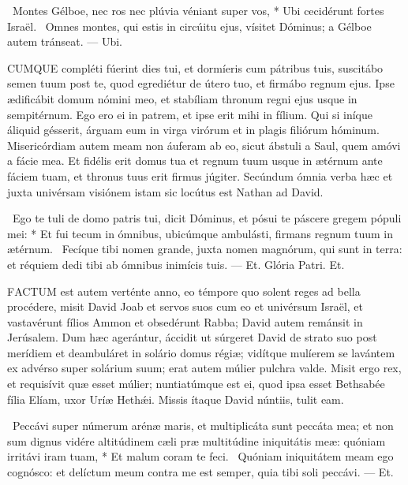 \R\ Montes Gélboe, nec ros nec plúvia véniant super vos, * Ubi cecidérunt fortes Israël. \V\ Omnes montes, qui estis in circúitu ejus, vísitet Dóminus; a Gélboe autem tránseat. --- Ubi.



\lettrine[lines=2]{C}{UMQUE} compléti fúerint dies tui, et dormíeris cum pátribus tuis, suscitábo semen tuum post te, quod egrediétur de útero tuo, et firmábo regnum ejus. Ipse ædificábit domum nómini meo, et stabíliam thronum regni ejus usque in sempitérnum. Ego ero ei in patrem, et ipse erit mihi in fílium. Qui si iníque áliquid gésserit, árguam eum in virga virórum et in plagis filiórum hóminum. Misericórdiam autem meam non áuferam ab eo, sicut ábstuli a Saul, quem amóvi a fácie mea. Et fidélis erit domus tua et regnum tuum usque in ætérnum ante fáciem tuam, et thronus tuus erit firmus júgiter. Secúndum ómnia verba hæc et juxta univérsam visiónem istam sic locútus est Nathan ad David.

\R\ Ego te tuli de domo patris tui, dicit Dóminus, et pósui te páscere gregem pópuli mei: * Et fui tecum in ómnibus, ubicúmque ambulásti, firmans regnum tuum in ætérnum. \V\ Fecíque tibi nomen grande, juxta nomen magnórum, qui sunt in terra: et réquiem dedi tibi ab ómnibus inimícis tuis. --- Et. Glória Patri. Et.




\lettrine[lines=2]{F}{ACTUM} est autem verténte anno, eo témpore quo solent reges ad bella procédere, misit David Joab et servos suos cum eo et univérsum Israël, et vastavérunt fílios Ammon et obsedérunt Rabba; David autem remánsit in Jerúsalem. Dum hæc agerántur, áccidit ut súrgeret David de strato suo post merídiem et deambuláret in solário domus régiæ; vidítque mulíerem se lavántem ex advérso super solárium suum; erat autem múlier pulchra valde. Misit ergo rex, et requisívit quæ esset múlier; nuntiatúmque est ei, quod ipsa esset Bethsabée fília Elíam, uxor Uríæ Hethǽi. Missis ítaque David núntiis, tulit eam.

\R\ Peccávi super númerum arénæ maris, et multiplicáta sunt peccáta mea; et non sum dignus vidére altitúdinem cæli præ multitúdine iniquitátis meæ: quóniam irritávi iram tuam, * Et malum coram te feci. \V\ Quóniam iniquitátem meam ego cognósco: et delíctum meum contra me est semper, quia tibi soli peccávi. --- Et.

